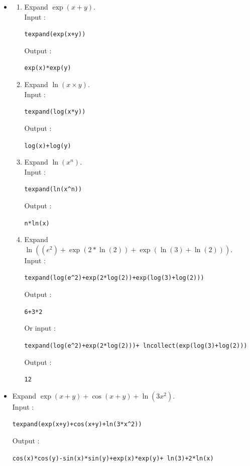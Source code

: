 \documentclass[a4paper,11pt]{book}
\begin{document}
\begin{itemize}
\begin{enumerate}
\end{enumerate}
\item \begin{enumerate}
\item Expand $\exp(x+y)$.\\
Input :
\begin{center}{\tt texpand(exp(x+y))}\end{center}
Output :
\begin{center}{\tt exp(x)*exp(y)}\end{center}
\item Expand $\ln(x\times y)$.\\
Input :
\begin{center}{\tt texpand(log(x*y))}\end{center}
Output :
\begin{center}{\tt log(x)+log(y)}\end{center}
\item Expand $\ln(x^n)$.\\
Input :
\begin{center}{\tt  texpand(ln(x\verb|^|n))}\end{center}
Output :
\begin{center}{\tt n*ln(x)}\end{center}
\item Expand $\ln((e^2)+\exp(2*\ln(2))+\exp(\ln(3)+\ln(2)))$.\\
Input :
\begin{center}{\tt texpand(log(e\verb|^|2)+exp(2*log(2))+exp(log(3)+log(2)))}\end{center}
Output :
\begin{center}{\tt 6+3*2}\end{center}
Or input :
\begin{center}{\tt texpand(log(e\verb|^|2)+exp(2*log(2)))+ lncollect(exp(log(3)+log(2)))}\end{center}
Output :
\begin{center}{\tt 12}\end{center}
\end{enumerate}
\item 
Expand $\exp(x+y)+\cos(x+y)+\ln(3x^2)$.\\
Input :
\begin{center}{\tt texpand(exp(x+y)+cos(x+y)+ln(3*x\verb|^|2))}\end{center}
Output :
\begin{center}{\tt cos(x)*cos(y)-sin(x)*sin(y)+exp(x)*exp(y)+ ln(3)+2*ln(x)}\end{center}
\end{itemize}
\end{document}
